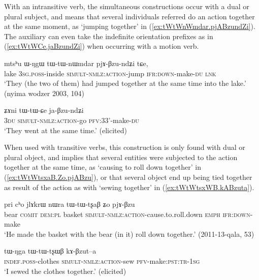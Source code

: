 
With an intransitive verb, the simultaneous constructions occur with a dual or plural subject, and means that several individuals referred do an action together at the same moment, as  `jumping together' in (\ref{ex:tWtWnWmdar.pjABzundZi}). The auxiliary  can even take the indefinite orientation prefixes   as in (\ref{ex:tWtWCe.jaBzundZi}) when occurring with a motion verb.

\begin{exe}
\ex \label{ex:tWtWnWmdar.pjABzundZi}
\gll  mtsʰu ɯ-ŋgɯ tɯ-tɯ-nɯmdar pjɤ-βzu-ndʑi tɕe, \\
 lake \textsc{3sg}.\textsc{poss}-inside \textsc{simult}-\textsc{nmlz}:\textsc{action}-jump \textsc{ifr}:\textsc{down}-make-\textsc{du} \textsc{lnk} \\
 \glt `They (the two of them) had jumped together at the same time into the lake.' (nyima wodzer 2003, 104)
\end{exe}

\begin{exe}
\ex \label{ex:tWtWCe.jaBzundZi}
\gll ʑɤni tɯ-tɯ-ɕe ja-βzu-ndʑi \\
\textsc{3du} \textsc{simult}-\textsc{nmlz}:\textsc{action}-go \textsc{pfv}:3\fl{}3'-make-\textsc{du} \\
\glt `They went at the same time.' (elicited)
 \end{exe}

 When used with transitive verbs, this construction is only found with dual or plural object, and implies that several entities were subjected to the action together at the same time, as  `causing to roll down together' in (\ref{ex:tWtWtsxaB.Zo.pjABzu}), or that several object end up being tied together as result of the action as with  `sewing together' in (\ref{ex:tWtWtsxWB.kABzuta}).
 
\begin{exe}
\ex \label{ex:tWtWtsxaB.Zo.pjABzu}
\gll  pri cʰo jlɤkrɯ nɯra tɯ-tɯ-tʂaβ ʑo pjɤ-βzu  \\
 bear \textsc{comit} \textsc{dem}:\textsc{pl}  basket  \textsc{simult}-\textsc{nmlz}:\textsc{action}-cause.to.roll.down \textsc{emph} \textsc{ifr}:\textsc{down}-make \\
\glt `He made the basket with the bear (in it) roll down together.' (2011-13-qala, 53) 
\end{exe}

\begin{exe}
\ex \label{ex:tWtWtsxWB.kABzuta}
\gll   tɯ-ŋga tɯ-tɯ-tʂɯβ kɤ-βzut--a \\
\textsc{indef}.\textsc{poss}-clothes \textsc{simult}-\textsc{nmlz}:\textsc{action}-sew \textsc{pfv}-make:\textsc{pst}:\textsc{tr}-\textsc{1sg} \\
\glt `I sewed the clothes together.' (elicited)
  \end{exe}
  

